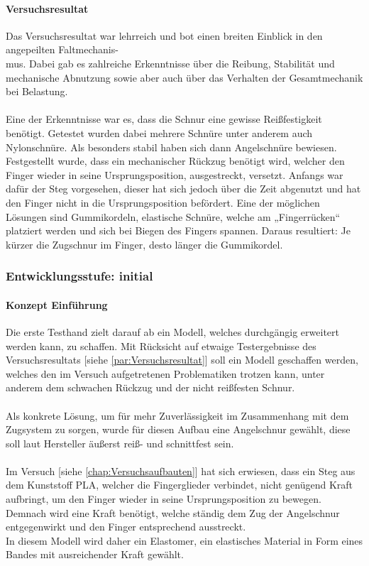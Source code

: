 \documentclass[titlepage,12pt,twoside]{article}
\begin{document}
\paragraph{Versuchsresultat}
\label{par:Versuchsresultat}
\hfill \break
\hfill \break
Das Versuchsresultat war lehrreich und bot einen breiten Einblick in den angepeilten Faltmechanis-\\mus. 
Dabei gab es zahlreiche Erkenntnisse über die Reibung, Stabilität und mechanische Abnutzung
sowie aber auch über das Verhalten der Gesamtmechanik bei Belastung. \\
\\
Eine der Erkenntnisse war es, dass die Schnur eine gewisse Reißfestigkeit benötigt. 
Getestet wurden dabei mehrere Schnüre unter anderem auch Nylonschnüre. Als besonders 
stabil haben sich dann Angelschnüre bewiesen.
Festgestellt wurde, dass ein mechanischer Rückzug benötigt wird, welcher den 
Finger wieder in seine Ursprungsposition, ausgestreckt, versetzt. Anfangs war dafür 
der Steg vorgesehen, dieser hat sich jedoch über die Zeit abgenutzt und hat den 
Finger nicht in die Ursprungsposition befördert. Eine der möglichen Lösungen sind 
Gummikordeln, elastische Schnüre, welche am „Fingerrücken“ platziert werden und sich 
bei Biegen des Fingers spannen. Daraus resultiert: Je kürzer die Zugschnur im Finger, desto länger die 
Gummikordel. \\

\subsubsection{Entwicklungsstufe: initial}
\label{chap:Entwicklungsstufe: intitial}
\paragraph{Konzept Einführung}
\hfill \break
\hfill \break
Die erste Testhand zielt darauf ab ein Modell, welches durchgängig erweitert 
werden kann, zu schaffen. Mit Rücksicht auf etwaige Testergebnisse des 
Versuchsresultats [siehe \textcolor{blue}{\autoref{par:Versuchsresultat}}] soll ein Modell geschaffen werden, 
welches den im Versuch aufgetretenen Problematiken trotzen kann, unter anderem 
dem schwachen Rückzug und der nicht reißfesten Schnur. \\
\\
Als konkrete Lösung, um für mehr Zuverlässigkeit im Zusammenhang mit dem Zugsystem 
zu sorgen, wurde für diesen Aufbau eine Angelschnur gewählt, diese soll laut Hersteller äußerst reiß- und schnittfest sein. \\
\\
Im Versuch [siehe \textcolor{blue}{\autoref{chap:Versuchsaufbauten}}] hat sich erwiesen, dass ein Steg aus dem Kunststoff PLA, welcher die 
Fingerglieder verbindet, nicht genügend Kraft aufbringt, um den Finger wieder in 
seine Ursprungsposition zu bewegen. Demnach wird eine Kraft benötigt, welche 
ständig dem Zug der Angelschnur entgegenwirkt und den Finger entsprechend 
ausstreckt. \\
In diesem Modell wird daher ein Elastomer, ein elastisches Material in Form 
eines Bandes mit ausreichender Kraft gewählt. \\
\newpage
\end{document}
